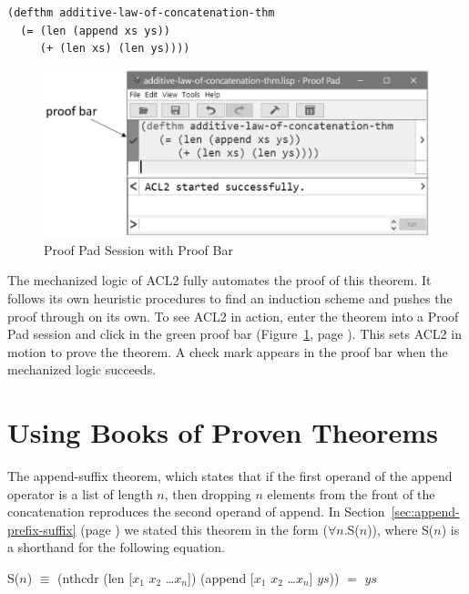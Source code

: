 \begin{Verbatim}
(defthm additive-law-of-concatenation-thm
  (= (len (append xs ys))
     (+ (len xs) (len ys))))
\end{Verbatim}

\begin{figure}
\begin{center}
\includegraphics[scale=0.55]{images/additive-law-of-concatenation-thm-acl2-prf-bw.png}
\end{center}
\caption{Proof Pad Session with Proof Bar}
\label{fig:proof-bar-with-chk}
\end{figure}

The mechanized logic of ACL2 fully automates the proof of this theorem.
It follows its own heuristic procedures to find an induction scheme
and pushes the proof through on its own.
To see ACL2 in action, enter the theorem into a Proof Pad session
and click in the green proof bar
(Figure~\ref{fig:proof-bar-with-chk}, page \pageref{fig:proof-bar-with-chk}).
This sets ACL2 in motion to prove the theorem.
A check mark appears in the proof bar
when the mechanized logic succeeds.

\section{Using Books of Proven Theorems}
\label{sec:using-books-of-proven-theorems}

The append-suffix theorem, which states that
if the first operand of the append operator is a list of length $n$,
then dropping $n$ elements from the front of the concatenation
reproduces the second operand of append.
In Section~\ref{sec:append-prefix-suffix} (page \pageref{append-suffix-thm-pencil-proof})
we stated this theorem in the form ($\forall$$n$.S($n$)),
where S($n$) is a shorthand for the following equation.

\begin{samepage}
\begin{center}
S($n$) $\equiv$ (nthcdr (len [$x_1$ $x_2$ \dots $x_n$]) (append [$x_1$ $x_2$ \dots $x_n$] $ys$)) $=$ $ys$
\end{center}
\end{samepage}

